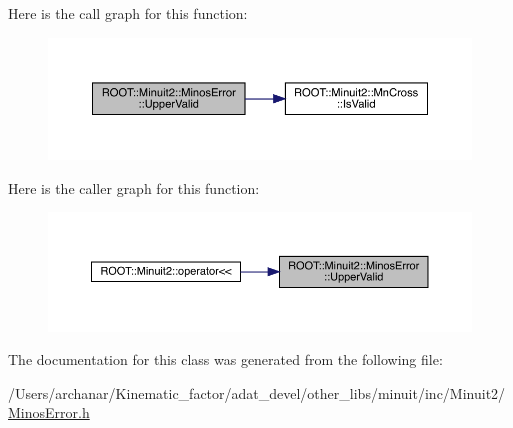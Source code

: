 Here is the call graph for this function\+:
\nopagebreak
\begin{figure}[H]
\begin{center}
\leavevmode
\includegraphics[width=350pt]{d2/dd1/classROOT_1_1Minuit2_1_1MinosError_a4180ae7ff87d9a2c0942c8e6ac81a8c0_cgraph}
\end{center}
\end{figure}
Here is the caller graph for this function\+:\nopagebreak
\begin{figure}[H]
\begin{center}
\leavevmode
\includegraphics[width=350pt]{d2/dd1/classROOT_1_1Minuit2_1_1MinosError_a4180ae7ff87d9a2c0942c8e6ac81a8c0_icgraph}
\end{center}
\end{figure}


The documentation for this class was generated from the following file\+:\begin{DoxyCompactItemize}
\item 
/\+Users/archanar/\+Kinematic\+\_\+factor/adat\+\_\+devel/other\+\_\+libs/minuit/inc/\+Minuit2/\mbox{\hyperlink{other__libs_2minuit_2inc_2Minuit2_2MinosError_8h}{Minos\+Error.\+h}}\end{DoxyCompactItemize}
